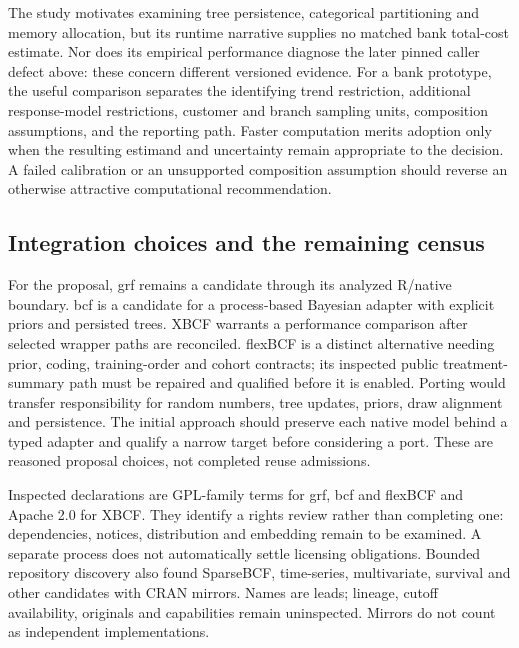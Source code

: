 The study motivates examining tree persistence, categorical partitioning and memory allocation, but its runtime narrative supplies no matched bank total-cost estimate. Nor does its empirical performance diagnose the later pinned caller defect above: these concern different versioned evidence. For a bank prototype, the useful comparison separates the identifying trend restriction, additional response-model restrictions, customer and branch sampling units, composition assumptions, and the reporting path. Faster computation merits adoption only when the resulting estimand and uncertainty remain appropriate to the decision. A failed calibration or an unsupported composition assumption should reverse an otherwise attractive computational recommendation.~\citep{rel17flexpaper,rel16flexcallers}

\subsection{Integration choices and the remaining census}
\label{exec21:cxx-integration}
For the proposal, grf remains a candidate through its analyzed R/native boundary. bcf is a candidate for a process-based Bayesian adapter with explicit priors and persisted trees. XBCF warrants a performance comparison after selected wrapper paths are reconciled. flexBCF is a distinct alternative needing prior, coding, training-order and cohort contracts; its inspected public treatment-summary path must be repaired and qualified before it is enabled. Porting would transfer responsibility for random numbers, tree updates, priors, draw alignment and persistence. The initial approach should preserve each native model behind a typed adapter and qualify a narrow target before considering a port. These are reasoned proposal choices, not completed reuse admissions.~\citep{exec21_cxx_grf,exec21_cxx_bcf,exec21_cxx_xbcf,exec21_cxx_flexbcf}

Inspected declarations are GPL-family terms for grf, bcf and flexBCF and Apache 2.0 for XBCF. They identify a rights review rather than completing one: dependencies, notices, distribution and embedding remain to be examined. A separate process does not automatically settle licensing obligations. Bounded repository discovery also found SparseBCF, time-series, multivariate, survival and other candidates with CRAN mirrors. Names are leads; lineage, cutoff availability, originals and capabilities remain uninspected. Mirrors do not count as independent implementations.~\citep{exec21_cxx_grf,exec21_cxx_bcf,exec21_cxx_xbcf,exec21_cxx_flexbcf}

